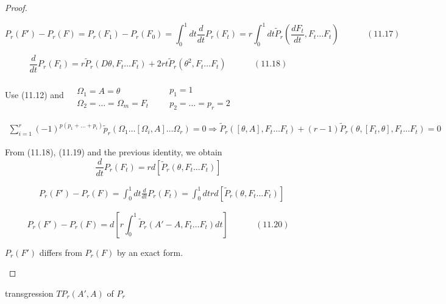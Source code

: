 \documentclass{book}
\begin{document}
\begin{proof}
\begin{enumerate}
\begin{equation}
  P_r(F') - P_r(F) = P_r(F_1) - P_r(F_0) = \int_0^1 dt \frac{d}{dt}P_r(F_t)=  r\int_0^1 dt \widetilde{P}_r\left( \frac{dF_t}{dt}, F_t \dots F_t\right) \quad \quad \quad \, (11.17)
\end{equation}

\begin{equation}
  \frac{d}{dt} P_r(F_t) = r \widetilde{P}_r( D\theta, F_t \dots F_t) + 2rt \widetilde{P}_r(\theta^2, F_t \dots F_t) \quad \quad \quad \, (11.18)
\end{equation}


Use (11.12) and $\begin{aligned} & \quad \\ 
  & \Omega_1 = A = \theta \\ 
  & \Omega_2 = \dots = \Omega_m = F_t \end{aligned}$ \quad \quad \, $\begin{aligned} & \quad \\ 
  & p_1 = 1 \\
  & p_2 = \dots = p_r = 2 \end{aligned}$ 

\[
\begin{gathered}
  \sum_{i=1}^r (-1)^{ p ( p_1 + \dots + p_i ) } \widetilde{p}_r( \Omega_1 \dots [\Omega_i , A ] \dots \Omega_r ) = 0 \Longrightarrow \widetilde{P}_r( [\theta , A ] , F_t \dots F_t) + (r-1) \widetilde{P}_r( \theta, [F_t, \theta]  , F_t \dots F_t) = 0 
\end{gathered}
\]

From (11.18), (11.19) and the previous identity, we obtain
\[
\frac{d}{dt} P_r(F_t) = rd[ \widetilde{P}_r(\theta, F_t \dots F_t) ]
\]

\[
\begin{aligned}
  & P_r(F') - P_r(F) = \int_0^1 dt \frac{d}{dt} P_r(F_t) = \int_0^1 dt r d[\widetilde{P}_r(\theta, F_t \dots F_t) ] 
\end{aligned} 
\]

\begin{equation}
   P_r(F') - P_r(F) = d \left[ r \int_0^1 \widetilde{P}_r(A'-A, F_t \dots F_t) dt \right] \quad \quad \quad \, (11.20)
\end{equation}

$P_r(F')$ differs from $P_r(F)$ by an exact form.  

\end{enumerate}
\end{proof}


transgression $TP_r(A',A)$ of $P_r$
\end{document}
